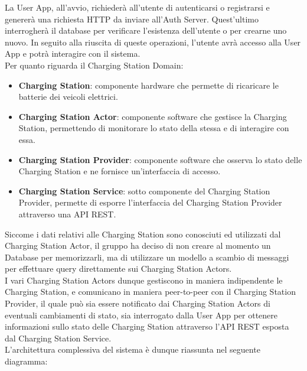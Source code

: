 La User App, all'avvio, richiederà all'utente di autenticarsi o registrarsi e genererà una richiesta HTTP da inviare all'Auth Server. Quest'ultimo interrogherà il database per verificare l'esistenza
dell'utente o per crearne uno nuovo. In seguito alla riuscita di queste operazioni, l'utente avrà accesso alla User App e potrà interagire con il sistema.\\

Per quanto riguarda il Charging Station Domain:
\begin{itemize}
    \item \textbf{Charging Station}: componente hardware che permette di ricaricare le batterie dei veicoli elettrici.
    \item \textbf{Charging Station Actor}: componente software che gestisce la Charging Station, permettendo di monitorare lo stato della stessa e di interagire con essa.
    \item \textbf{Charging Station Provider}: componente software che osserva lo stato delle Charging Station e ne fornisce un'interfaccia di accesso.
    \item \textbf{Charging Station Service}: sotto componente del Charging Station Provider, permette di esporre l'interfaccia del Charging Station Provider attraverso una API REST. \\
\end{itemize}

Siccome i dati relativi alle Charging Station sono conosciuti ed utilizzati dal Charging Station Actor, il gruppo ha deciso di non creare al momento un Database per memorizzarli, ma di utilizzare un modello a scambio di messaggi per effettuare
query direttamente sui Charging Station Actors.\\

I vari Charging Station Actors dunque gestiscono in maniera indipendente le Charging Station, e comunicano in maniera peer-to-peer con il Charging Station Provider, il quale può sia essere notificato
dai Charging Station Actors di eventuali cambiamenti di stato, sia interrogato dalla User App per ottenere informazioni sullo stato delle Charging Station attraverso l'API REST esposta dal Charging Station Service.\\

L'architettura complessiva del sistema è dunque riassunta nel seguente diagramma:

